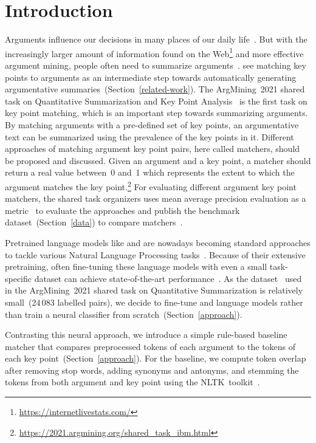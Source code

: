 \section{Introduction}\label{introduction}

Arguments influence our decisions in many places of our daily life~\cite{Bar-HaimEFKLS2020}. 
But with the increasingly larger amount of information found on the Web\footnote{\url{https://internetlivestats.com/}} 
and more effective argument mining, people often need to summarize arguments~\cite{LawrenceR2019,Bar-HaimEFKLS2020}. 
\citet{Bar-HaimEFKLS2020} see matching key points to arguments as an intermediate step towards automatically generating 
argumentative summaries~(Section~\ref{related-work}). 
The ArgMining~2021 shared task on Quantitative Summarization and Key Point Analysis~\cite{kpa-2021-overview} is the first task on key point matching, 
which is an important step towards summarizing arguments. 
By matching arguments with a pre-defined set of key points, an argumentative text can be summarized using the prevalence of the key points in it. 
Different approaches of matching argument key point pairs, here called matchers, should be proposed and discussed. 
Given an argument and a key point, a matcher should return a real value between~0 and~1 which represents the extent to which the argument matches the key point.\footnote{\url{https://2021.argmining.org/shared_task_ibm.html}} 
For evaluating different argument key point matchers, the shared task organizers uses mean average 
precision evaluation as a metric~\cite{kpa-2021-overview} to evaluate the approaches and publish the \ArgKP benchmark dataset~(Section~\ref{data}) to compare 
matchers~\cite{Bar-HaimEFKLS2020}. %

Pretrained language models like \Bert and \Roberta are nowadays becoming standard approaches to tackle various Natural 
Language Processing tasks~\cite{DevlinCLT2019,LiuOGDJCLLZS2019}. 
Because of their extensive pretraining, often fine-tuning these language models with even a small task-specific dataset 
can achieve state-of-the-art performance~\cite{DevlinCLT2019}. 
As the \ArgKP dataset~\cite{Bar-HaimEFKLS2020} used in the ArgMining~2021 shared task on Quantitative Summarization is 
relatively small~(24\,083 labelled pairs), we decide to fine-tune \Bert and \Roberta language models rather than train 
a neural classifier from scratch~(Section~\ref{approach}).

Contrasting this neural approach, we introduce a simple rule-based baseline matcher that compares preprocessed tokens of 
each argument to the tokens of each key point~(Section~\ref{approach}). 
For the baseline, we compute token overlap after removing stop words, adding synonyms and antonyms, and stemming the 
tokens from both argument and key point using the NLTK~toolkit~\cite{BirdL2004}.

